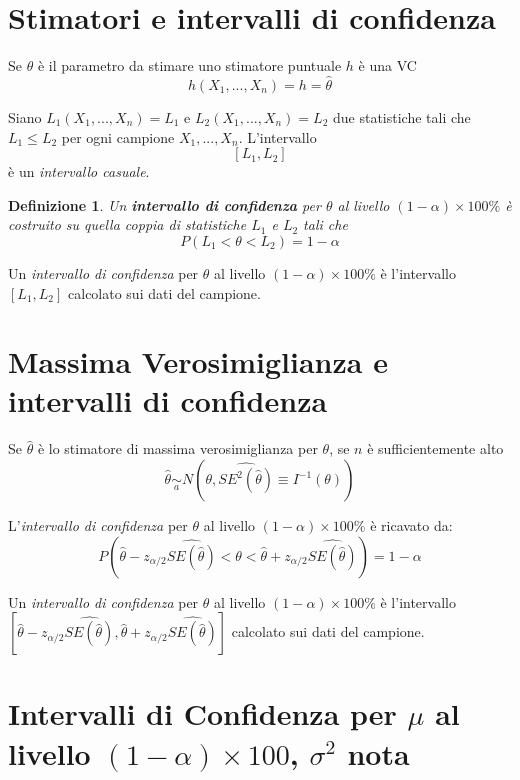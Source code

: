 \documentclass[
  11pt,
]{book}
\theoremstyle{mytheoremstyle}
\theoremstyle{mydefstyle}
\newtheorem{definition}{Definizione}[section]
\begin{document}
\section{Stimatori e intervalli di confidenza}\label{stimatori-e-intervalli-di-confidenza}

Se \(\theta\) è il parametro da stimare uno stimatore puntuale \(h\) è una VC
\[h(X_1,...,X_n)=h=\hat\theta\]

Siano \(L_1(X_1,...,X_n)=L_1\) e \(L_2(X_1,...,X_n)=L_2\) due statistiche tali che
\(L_1\leq L_2\) per ogni campione \(X_1,...,X_n\).
L'intervallo
\[[L_1,L_2]\]
è un \emph{intervallo casuale}.

\begin{info}

\begin{definition}
Un \textbf{intervallo di confidenza} per \(\theta\) al livello \((1-\alpha)\times 100\%\) è costruito su quella coppia di statistiche \(L_1\) e \(L_2\) tali che
\[P(L_1<\theta<L_2)=1-\alpha\]
\end{definition}

\end{info}

Un \emph{intervallo di confidenza} per \(\theta\) al livello \((1-\alpha)\times 100\%\) è l'intervallo \([L_1,L_2]\) calcolato sui dati del campione.

\section{Massima Verosimiglianza e intervalli di confidenza}\label{massima-verosimiglianza-e-intervalli-di-confidenza}

Se \(\hat\theta\) è lo stimatore di massima verosimiglianza per \(\theta\), se \(n\) è sufficientemente alto
\[\hat\theta\operatorname*{\sim}_a N(\theta,\widehat{SE^2(\hat\theta)}\equiv I^{-1}(\theta))\]

L'\emph{intervallo di confidenza} per \(\theta\) al livello \((1-\alpha)\times 100\%\) è ricavato da:
\[P(\hat\theta-z_{\alpha/2}\widehat{SE(\hat\theta)}<\theta<\hat\theta+z_{\alpha/2}\widehat{SE(\hat\theta)})=1-\alpha\]

Un \emph{intervallo di confidenza} per \(\theta\) al livello \((1-\alpha)\times 100\%\) è l'intervallo \([\hat\theta-z_{\alpha/2}\widehat{SE(\hat\theta)},\hat\theta+z_{\alpha/2}\widehat{SE(\hat\theta)}]\) calcolato sui dati del campione.

\section{\texorpdfstring{Intervalli di Confidenza per \(\mu\) al livello \((1-\alpha)\times 100\), \(\sigma^2\) nota}{Intervalli di Confidenza per \textbackslash mu al livello (1-\textbackslash alpha)\textbackslash times 100, \textbackslash sigma\^{}2 nota}}\label{intervalli-di-confidenza-per-mu-al-livello-1-alphatimes-100-sigma2-nota}
\end{document}
